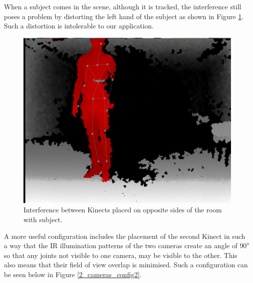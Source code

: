 \documentclass[11pt,a4paper]{article}
\begin{document}
\noindent
When a subject comes in the scene, although it is tracked, the interference still poses a problem by distorting the left hand of the subject as shown in Figure \ref{IR_interference_w_subject}. Such a distortion is intolerable to our application. 

\begin{figure}[H]
\centering
\includegraphics[scale=0.2]{IR_Interference3.jpg}
\caption{Interference between Kinects placed on opposite sides of the room with subject.}
\label{IR_interference_w_subject}
\end{figure}

\noindent
A more useful configuration includes the placement of the second Kinect in such a way that the IR illumination patterns of the two cameras create an angle of $90^o$ so that any joints not visible to one camera, may be visible to the other. This also means that their field of view overlap is minimised. Such a configuration can be seen below in Figure \ref{2_cameras_config2}.
\end{document}
